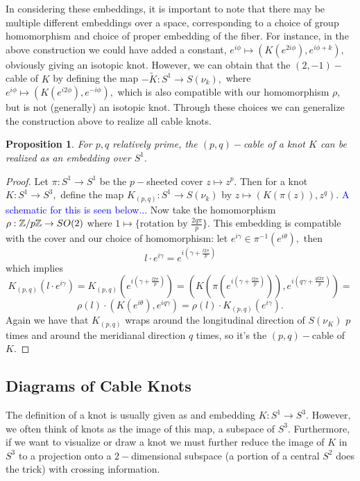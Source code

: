 \documentclass[a4paper, 12 pt, reqno]{amsart}
\newtheorem{prop}[theorem]{Proposition}
\theoremstyle{definition}
\theoremstyle{remark}
\begin{document}
In considering these embeddings, it is important to note that there may be multiple different embeddings over a space, corresponding to a choice of group homomorphism and choice of proper embedding of the fiber. For instance, in the above construction we could have added a constant, $e^{i\phi} \mapsto (K(e^{2i\phi}), e^{i\phi + k}),$ obviously giving an isotopic knot. However, we can obtain that the $(2, -1)-$cable of $K$ by defining the map $-\widetilde{K}: S^{1} \rightarrow S(\nu_{k}),$ where $e^{i\phi} \mapsto (K(e^{i2\phi}), e^{-i\phi}),$ which is also compatible with our homomorphism $\rho$, but is not (generally) an isotopic knot. Through these choices we can generalize the construction above to realize all cable knots.

\begin{prop}
For $p,q$ relatively prime, the $(p,q)-$cable of a knot $K$ can be realized as an embedding over $S^{1}.$
\end{prop}

\begin{proof}
Let $\pi: S^{1} \rightarrow S^{1}$ be the $p-$sheeted cover $z \mapsto z^{p}.$ Then for a knot $K: S^{1} \rightarrow S^{3},$ define the map $K_{(p,q)}: S^{1} \rightarrow S(\nu_{k})$ by $z \mapsto (K(\pi(z)), z^{q}).$ \textcolor{blue}{A schematic for this is seen below...} Now take the homomorphism $\rho: \mathbb Z/p\mathbb Z \rightarrow SO(2)$ where $1 \mapsto \{\text{rotation by } \frac{2q\pi}{p}\}.$ This embedding is compatible with the cover and our choice of homomorphism: let $e^{i\gamma} \in \pi^{-1}(e^{i\theta}),$ then $$l \cdot e^{i\gamma} = e^{i(\gamma + \frac{l2\pi}{p})}$$ which implies $$K_{(p,q)}(l \cdot e^{i\gamma}) = K_{(p,q)}(e^{i(\gamma + \frac{l2\pi}{p})}) = (K(\pi(e^{i(\gamma + \frac{l2\pi}{p})})), e^{i(q\gamma + \frac{ql2\pi}{p})}) = $$ $$\rho(l) \cdot (K(e^{i\theta}), e^{iq\gamma}) = \rho(l) \cdot K_{(p, q)}(e^{i\gamma}).$$
Again we have that $K_{(p,q)}$ wraps around the longitudinal direction of $S(\nu_{K})$ $p$ times and around the meridianal direction $q$ times, so it's the $(p, q)-$cable of $K$. 
\end{proof}

\subsection{Diagrams of Cable Knots} %
The definition of a knot is usually given as and embedding $K: S^{1} \rightarrow S^{3}.$ However, we often think of knots as the image of this map, a subspace of $S^{3}$. Furthermore, if we want to visualize or draw a knot we must further reduce the image of $K$ in $S^{3}$ to a projection onto a $2-$dimensional subspace (a portion of a central $S^{2}$ does the trick) with crossing information. 
\end{document}
